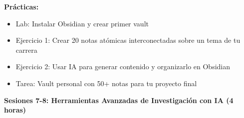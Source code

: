 \documentclass[12pt,a4paper]{yaac-luatex}
\newcommand{\subsecciontitulo}[1]{
	{\color{maincolor}\large\bfseries #1}
}
\begin{document}
\begin{tcolorbox}[
		enhanced,
		colback=white,
		colframe=curso1color,
		arc=3pt,
		boxrule=1.5pt,
		left=10pt,
		right=10pt,
		top=8pt,
		bottom=8pt,
		breakable
		]
		\textbf{Prácticas:}
		\begin{itemize}[leftmargin=*, itemsep=0.1cm]
			\item Lab: Instalar Obsidian y crear primer vault
			\item Ejercicio 1: Crear 20 notas atómicas interconectadas sobre un tema de tu carrera
			\item Ejercicio 2: Usar IA para generar contenido y organizarlo en Obsidian
			\item Tarea: Vault personal con 50+ notas para tu proyecto final
		\end{itemize}
	\end{tcolorbox}
	
	\vspace{0.3cm}
	
	\begin{tcolorbox}[
		enhanced,
		colback=white,
		colframe=curso1color,
		arc=3pt,
		boxrule=1.5pt,
		left=10pt,
		right=10pt,
		top=8pt,
		bottom=8pt,
		breakable
		]
		\subsecciontitulo{Sesiones 7-8: Herramientas Avanzadas de Investigación con IA (4 horas)}
		

\end{tcolorbox}
\end{document}
